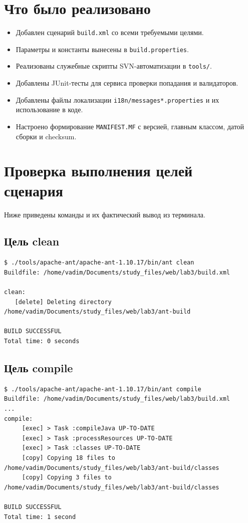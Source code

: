 \documentclass[12pt,a4paper]{article}
\begin{document}
\section{Что было реализовано}
\begin{itemize}
    \item Добавлен сценарий \texttt{build.xml} со всеми требуемыми целями.
    \item Параметры и константы вынесены в \texttt{build.properties}.
    \item Реализованы служебные скрипты SVN-автоматизации в \texttt{tools/}.
    \item Добавлены JUnit-тесты для сервиса проверки попадания и валидаторов.
    \item Добавлены файлы локализации \texttt{i18n/messages*.properties} и их использование в коде.
    \item Настроено формирование \texttt{MANIFEST.MF} с версией, главным классом, датой сборки и checksum.
\end{itemize}

\section{Проверка выполнения целей сценария}
Ниже приведены команды и их фактический вывод из терминала.

\subsection*{Цель clean}
\begin{Verbatim}[fontsize=\small,breaklines=true]
$ ./tools/apache-ant/apache-ant-1.10.17/bin/ant clean
Buildfile: /home/vadim/Documents/study_files/web/lab3/build.xml

clean:
   [delete] Deleting directory /home/vadim/Documents/study_files/web/lab3/ant-build

BUILD SUCCESSFUL
Total time: 0 seconds
\end{Verbatim}

\subsection*{Цель compile}
\begin{Verbatim}[fontsize=\small,breaklines=true]
$ ./tools/apache-ant/apache-ant-1.10.17/bin/ant compile
Buildfile: /home/vadim/Documents/study_files/web/lab3/build.xml
...
compile:
     [exec] > Task :compileJava UP-TO-DATE
     [exec] > Task :processResources UP-TO-DATE
     [exec] > Task :classes UP-TO-DATE
     [copy] Copying 18 files to /home/vadim/Documents/study_files/web/lab3/ant-build/classes
     [copy] Copying 3 files to /home/vadim/Documents/study_files/web/lab3/ant-build/classes

BUILD SUCCESSFUL
Total time: 1 second
\end{Verbatim}
\end{document}
